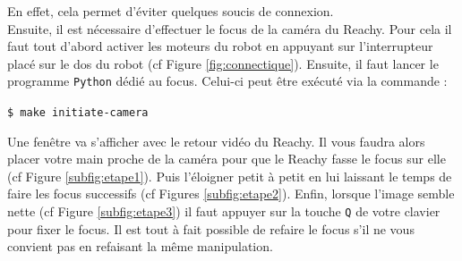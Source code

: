 \documentclass[a4paper,french]{article}
\begin{document}
En effet, cela permet d'éviter quelques soucis de connexion. \\

Ensuite, il est nécessaire d'effectuer le focus de la caméra du Reachy. Pour cela il faut tout d'abord activer les moteurs du robot en appuyant sur l'interrupteur placé sur le dos du robot (cf \texttt{\color{red}{(4)}} Figure \ref{fig:connectique}). Ensuite, il faut lancer le programme \texttt{Python} dédié au focus. Celui-ci peut être exécuté via la commande :
\begin{center}
\texttt{\$ make initiate-camera}
\end{center}

Une fenêtre va s'afficher avec le retour vidéo du Reachy. Il vous faudra alors placer votre main proche de la caméra pour que le Reachy fasse le focus sur elle (cf Figure \ref{subfig:etape1}). Puis l'éloigner petit à petit en lui laissant le temps de faire les focus successifs (cf Figures \ref{subfig:etape2}). Enfin, lorsque l'image semble nette (cf Figure \ref{subfig:etape3}) il faut appuyer sur la touche \texttt{Q} de votre clavier pour fixer le focus. Il est tout à fait possible de refaire le focus s'il ne vous convient pas en refaisant la même manipulation. \\
\end{document}
